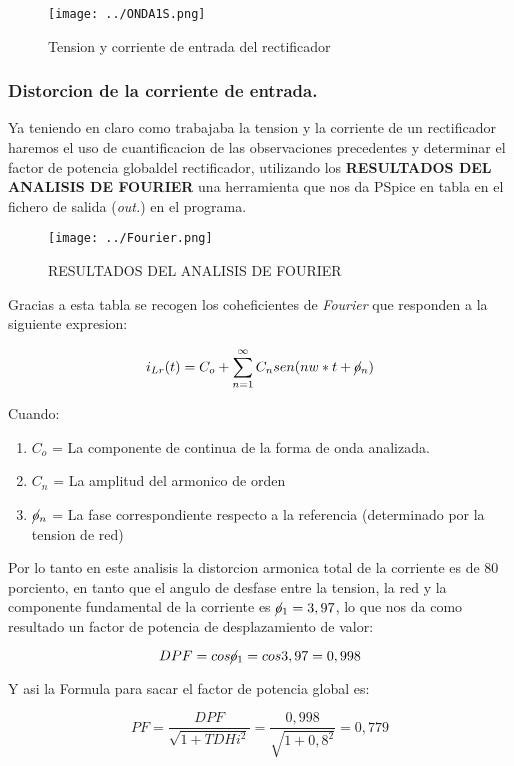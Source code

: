 \documentclass[11pt,a4paper]{article}
\begin{document}
\begin{figure}[h]
\centering
\texttt{[image: ../ONDA1S.png]} 
\caption{Tension y corriente de entrada del rectificador}
\end{figure}

\subsubsection{Distorcion de la corriente de entrada.}
Ya teniendo en claro como trabajaba la tension y la corriente de un rectificador haremos el uso de cuantificacion de las observaciones precedentes y determinar el factor de potencia globaldel rectificador, utilizando los \textbf{RESULTADOS DEL ANALISIS DE FOURIER} una herramienta que nos da PSpice en tabla en el fichero de salida (\emph{out.}) en el programa.\\

\begin{figure}[h]
\centering
\texttt{[image: ../Fourier.png]} 
\caption{RESULTADOS DEL ANALISIS DE FOURIER}
\end{figure}

Gracias a esta tabla se recogen los coheficientes de \emph{Fourier} que responden a la siguiente expresion:

$$ i_{Lr} (t) = C_{o} + \sum_{n=1}^{\infty} C_{n} sen(nw * t+ \cancel{o}_{n} ) $$

Cuando:\begin{enumerate}
\item $ C_{o} $ = La componente de continua de la forma de onda analizada.
\item $ C_{n} $ = La amplitud del armonico de orden
\item $ \cancel{o}_{n} $ = La fase correspondiente respecto a la referencia (determinado por la tension de red)
\end{enumerate}

Por lo tanto en este analisis la distorcion armonica total de la corriente es de 80 porciento, en tanto que el angulo de desfase entre la tension, la red y la componente fundamental de la corriente es $ \cancel{o}_{1} = 3,97 $, lo que nos da como resultado un factor de potencia de desplazamiento de valor:

$$ DPF = cos\cancel{o}_{1} = cos3,97 = 0,998 $$

Y asi la Formula para sacar el factor de potencia global es:

$$ PF = \dfrac{DPF}{\sqrt{1 + TDHi^2}} = \dfrac{0,998}{\sqrt{1 + 0,8^2}} = 0,779 $$
\end{document}
